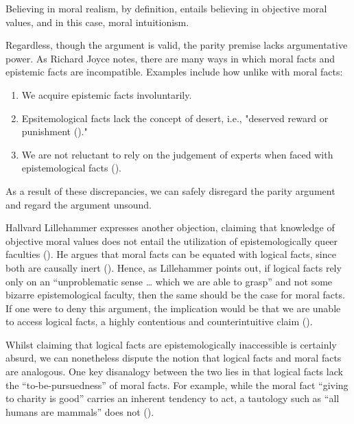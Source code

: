 Believing in moral realism, by definition, entails believing in objective moral values, and in this case, moral intuitionism. 

Regardless, though the argument is valid, the parity premise lacks argumentative power. As Richard Joyce notes, there are many ways in which moral facts and epistemic facts are incompatible. Examples include how unlike with moral facts: 

\begin{enumerate}

	\item We acquire epistemic facts involuntarily.

	\item Epsitemological facts lack the concept of desert, i.e., "deserved reward or punishment (\cite{merriam2024desert})."

	\item We are not reluctant to rely on the judgement of experts when faced with epistemological facts (\cite[pp.\ 14–16]{joyce2007evolution}).

\end{enumerate}

As a result of these discrepancies, we can safely disregard the parity argument and regard the argument unsound.  

Hallvard Lillehammer expresses another objection, claiming that knowledge of objective moral values does not entail the utilization of epistemologically queer faculties (\cite{balaguer2016platonism}). He argues that moral facts can be equated with logical facts, since both are causally inert (\cite{balaguer2016platonism}). Hence, as Lillehammer points out, if logical facts rely only on an “unproblematic sense … which we are able to grasp” and not some bizarre epistemological faculty, then the same should be the case for moral facts. If one were to deny this argument, the implication would be that we are unable to access logical facts, a highly contentious and counterintuitive claim (\cite[p.\ 6]{lillehammer2019queerness}). 

Whilst claiming that logical facts are epistemologically inaccessible is certainly absurd, we can nonetheless dispute the notion that logical facts and moral facts are analogous. One key disanalogy between the two lies in that logical facts lack the “to-be-pursuedness” of moral facts. For example, while the moral fact “giving to charity is good” carries an inherent tendency to act, a tautology such as “all humans are mammals” does not (\cite{britannica2024tautology}). 

